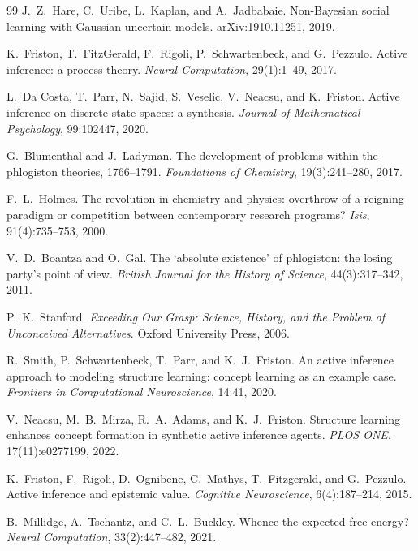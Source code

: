 \documentclass[runningheads]{llncs}
\begin{document}
\begin{thebibliography}{99}
J.~Z.~Hare, C.~Uribe, L.~Kaplan, and A.~Jadbabaie.
Non-Bayesian social learning with Gaussian uncertain models.
arXiv:1910.11251, 2019.

K.~Friston, T.~FitzGerald, F.~Rigoli, P.~Schwartenbeck, and G.~Pezzulo.
Active inference: a process theory. \emph{Neural Computation}, 29(1):1--49, 2017.

L.~Da Costa, T.~Parr, N.~Sajid, S.~Veselic, V.~Neacsu, and K.~Friston.
Active inference on discrete state-spaces: a synthesis.
\emph{Journal of Mathematical Psychology}, 99:102447, 2020.

G.~Blumenthal and J.~Ladyman.
The development of problems within the phlogiston theories, 1766--1791.
\emph{Foundations of Chemistry}, 19(3):241--280, 2017.

F.~L.~Holmes.
The revolution in chemistry and physics: overthrow of a reigning paradigm or competition between
contemporary research programs? \emph{Isis}, 91(4):735--753, 2000.

V.~D.~Boantza and O.~Gal.
The `absolute existence' of phlogiston: the losing party's point of view.
\emph{British Journal for the History of Science}, 44(3):317--342, 2011.

P.~K.~Stanford.
\emph{Exceeding Our Grasp: Science, History, and the Problem of Unconceived Alternatives}.
Oxford University Press, 2006.

R.~Smith, P.~Schwartenbeck, T.~Parr, and K.~J.~Friston.
An active inference approach to modeling structure learning: concept learning as an example case.
\emph{Frontiers in Computational Neuroscience}, 14:41, 2020.

V.~Neacsu, M.~B.~Mirza, R.~A.~Adams, and K.~J.~Friston.
Structure learning enhances concept formation in synthetic active inference agents.
\emph{PLOS ONE}, 17(11):e0277199, 2022.

K.~Friston, F.~Rigoli, D.~Ognibene, C.~Mathys, T.~Fitzgerald, and G.~Pezzulo.
Active inference and epistemic value. \emph{Cognitive Neuroscience}, 6(4):187--214, 2015.

B.~Millidge, A.~Tschantz, and C.~L.~Buckley.
Whence the expected free energy? \emph{Neural Computation}, 33(2):447--482, 2021.
\end{thebibliography}
\clearpage
\appendix
\renewcommand{\theHsection}{appendix.\Alph{section}}
\renewcommand{\theHsubsection}{\theHsection.\arabic{subsection}}
\end{document}
